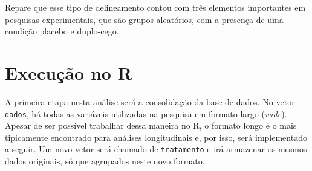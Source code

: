\documentclass[
]{book}
\newenvironment{Shaded}{\begin{snugshade}}{\end{snugshade}}
\newcommand{\DataTypeTok}[1]{\textcolor[rgb]{0.13,0.29,0.53}{#1}}
\newcommand{\DecValTok}[1]{\textcolor[rgb]{0.00,0.00,0.81}{#1}}
\newcommand{\KeywordTok}[1]{\textcolor[rgb]{0.13,0.29,0.53}{\textbf{#1}}}
\newcommand{\NormalTok}[1]{#1}
\newcommand{\OperatorTok}[1]{\textcolor[rgb]{0.81,0.36,0.00}{\textbf{#1}}}
\newcommand{\StringTok}[1]{\textcolor[rgb]{0.31,0.60,0.02}{#1}}
\begin{document}
Repare que esse tipo de delineamento contou com três elementos importantes em pesquisas experimentais, que são grupos aleatórios, com a presença de uma condição placebo e duplo-cego.

\hypertarget{execuuxe7uxe3o-no-r-11}{%
\section{Execução no R}\label{execuuxe7uxe3o-no-r-11}}

A primeira etapa nesta análise será a consolidação da base de dados. No vetor \texttt{dados}, há todas as variáveis utilizadas na pesquisa em formato largo (\emph{wide}). Apesar de ser possível trabalhar dessa maneira no R, o formato longo é o mais tipicamente encontrado para análises longitudinais e, por isso, será implementado a seguir. Um novo vetor será chamado de \texttt{tratamento} e irá armazenar os mesmos dados originais, só que agrupados neste novo formato.

\begin{Shaded}
\end{Shaded}
\end{document}
